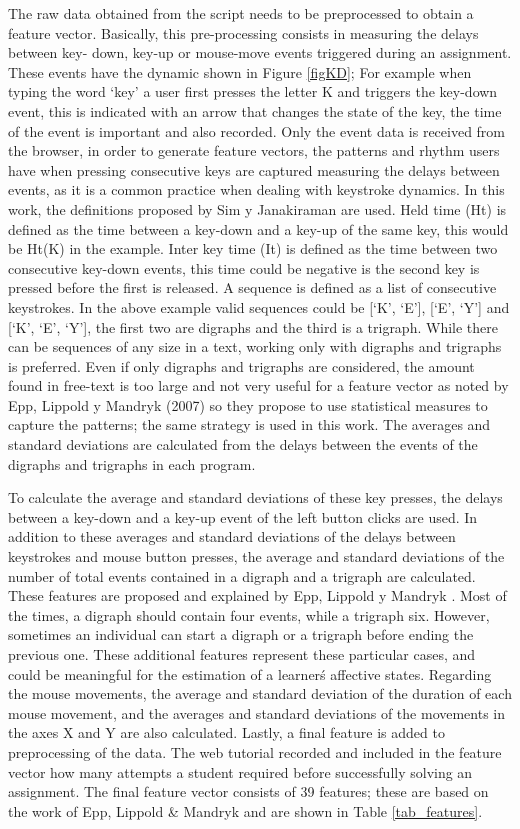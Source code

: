 \documentclass[a4paper,twoside]{article}
\begin{document}
The raw data obtained from the script needs to be preprocessed to obtain a feature vector.
Basically, this pre-processing consists in measuring the delays between key-
down, key-up or mouse-move events triggered during an assignment.
These events have the dynamic shown in Figure \ref{figKD};
For example when typing the word ‘key’ a
user first presses the letter K and triggers the key-down event, this is
indicated with an arrow that changes the state of the key, the time of the event
is important and also recorded. Only the event data is received from the
browser, in order to generate feature vectors, the patterns and rhythm users
have when pressing consecutive keys are captured measuring the delays between
events, as it is a common practice when dealing with keystroke dynamics. In this
work, the definitions proposed by Sim y Janakiraman \cite{sim2007digraphs} are used. Held
time (Ht) is defined as the time between a key-down and a key-up of the same
key, this would be Ht(K) in the example. Inter key time (It) is defined as the
time between two consecutive key-down events, this time could be negative is the
second key is pressed before the first is released. A sequence is defined as a
list of consecutive keystrokes. In the above example valid sequences could be
[‘K’, ‘E’], [‘E’, ‘Y’] and [‘K’, ‘E’, ‘Y’], the first two are digraphs and the
third is a trigraph. While there can be sequences of any size in a text, working
only with digraphs and trigraphs is preferred. Even if only digraphs and
trigraphs are considered, the amount found in free-text is too large and not
very useful for a feature vector as noted by Epp, Lippold y Mandryk (2007) so
they propose to use statistical measures to capture the patterns; the same
strategy is used in this work. The averages and standard deviations are
calculated from the delays between the events of the digraphs and trigraphs in
each program.


To calculate the average and standard deviations of these key presses, the delays
between a key-down and a key-up event of the left button clicks are used. In
addition to these averages and standard deviations of the delays between
keystrokes and mouse button presses, the average and standard deviations of the
number of total events contained in a digraph and a trigraph are calculated.
These features are proposed and explained by Epp, Lippold y Mandryk \cite{epp2011identifying}. Most
of the times, a digraph should contain four events, while a trigraph six.
However, sometimes an individual can start a digraph or a trigraph before ending
the previous one. These additional features represent these particular cases,
and could be meaningful for the estimation of a learner\'s affective states.
Regarding the mouse movements, the average and standard deviation of the
duration of each mouse movement, and the averages and standard deviations of the
movements in the axes X and Y are also calculated. Lastly, a final feature is
added to preprocessing of the data. The web tutorial recorded  and included in the feature vector how many attempts
a student required before successfully solving an assignment. The final feature vector
consists of 39 features; these are based on the work of Epp, Lippold \& Mandryk
\cite{epp2011identifying} and are shown in Table \ref{tab_features}.
\end{document}
